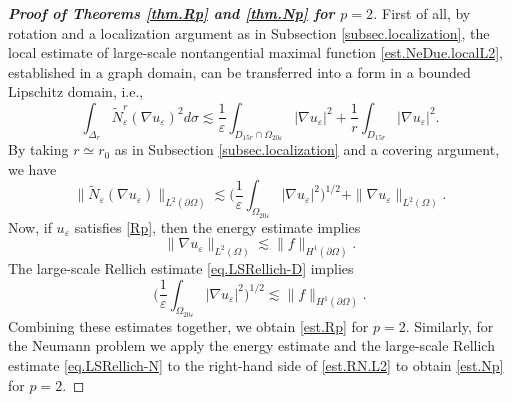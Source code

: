 \documentclass[reqno,12pt]{amsart} %
\newtheorem{theorem}{Theorem}[section]
\newtheorem{corollary}[theorem]{Corollary}
\theoremstyle{definition}
\theoremstyle{remark}
\numberwithin{equation}{section}
\newcommand{\cL}{\mathcal{L}}
\newcommand{\e}{\varepsilon}
\begin{document}


\begin{proof}[\textbf{Proof of Theorems \ref{thm.Rp} and \ref{thm.Np} for $p = 2$}]
    First of all, by rotation and a localization argument as in Subsection \ref{subsec.localization}, the local estimate of large-scale nontangential maximal function \eqref{est.NeDue.localL2}, established in a graph domain, can be transferred into a form in a bounded Lipschitz domain, i.e.,
    \begin{equation}
    \int_{\Delta_{r}} \widetilde{N}_\e^{r}(\nabla u_\e)^2 d\sigma \lesssim \frac{1}{\e} \int_{D_{15r} \cap \Omega_{20\e}} |\nabla u_\e|^2 + \frac{1}{r}\int_{D_{15r}} |\nabla u_\e|^2. 
    \end{equation}
    By taking $r \simeq r_0$ as in Subsection \ref{subsec.localization} and a covering argument, we have
    \begin{equation}\label{est.RN.L2}
        \| \widetilde{N}_\e(\nabla u_\e) \|_{L^2(\partial \Omega)} \lesssim \bigg( \frac{1}{\e} \int_{\Omega_{20\e} } |\nabla u_\e|^2 \bigg)^{1/2} + \| \nabla u_\e \|_{L^2(\Omega)}.
    \end{equation}
    Now,  if $u_\e$ satisfies \eqref{Rp}, then the energy estimate implies
    \begin{equation}
        \| \nabla u_\e \|_{L^2(\Omega)} \lesssim  \|  f \|_{H^1(\partial \Omega)}.
    \end{equation}
    The large-scale Rellich estimate \eqref{eq.LSRellich-D} implies
    \begin{equation}
        \bigg( \frac{1}{\e} \int_{\Omega_{20\e} } |\nabla u_\e|^2 \bigg)^{1/2} \lesssim  \|  f \|_{H^1(\partial \Omega)}.
    \end{equation}
    Combining these estimates together, we obtain \eqref{est.Rp} for $p = 2$. Similarly, for the Neumann problem we apply the energy estimate and the large-scale Rellich estimate \eqref{eq.LSRellich-N} to the right-hand side of \eqref{est.RN.L2} to obtain \eqref{est.Np} for $p = 2$.
\end{proof}
\end{document}
